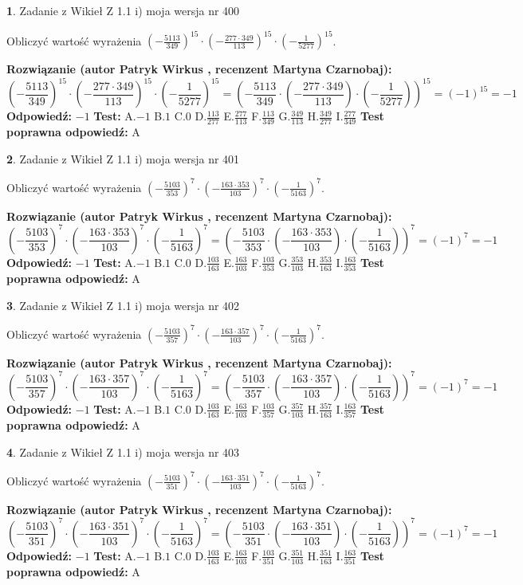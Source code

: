 \documentclass[12pt, a4paper]{article}
\theoremstyle{definition} %
\newtheorem{zad}{}
\newcommand{\zadStart}[1]{\begin{zad}#1\newline}
\newcommand{\zadStop}{\end{zad}}
\newcommand{\rozwStart}[2]{\noindent \textbf{Rozwiązanie (autor #1 , recenzent #2): }\newline}
\newcommand{\rozwStop}{\newline}
\newcommand{\odpStart}{\noindent \textbf{Odpowiedź:}\newline}
\newcommand{\odpStop}{\newline}
\newcommand{\testStart}{\noindent \textbf{Test:}\newline}
\newcommand{\testStop}{\newline}
\newcommand{\kluczStart}{\noindent \textbf{Test poprawna odpowiedź:}\newline}
\newcommand{\kluczStop}{\newline}
\begin{document}
\zadStart{Zadanie z Wikieł Z 1.1 i) moja wersja nr 400}

Obliczyć wartość wyrażenia $(-\frac{5113}{349})^{15} \cdot (-\frac{277 \cdot 349}{113})^{15} \cdot (-\frac{1}{5277})^{15}$.
\zadStop
\rozwStart{Patryk Wirkus}{Martyna Czarnobaj}
$$(-\frac{5113}{349})^{15} \cdot (-\frac{277 \cdot 349}{113})^{15} \cdot (-\frac{1}{5277})^{15} = (-\frac{5113}{349} \cdot (-\frac{277 \cdot 349}{113}) \cdot (-\frac{1}{5277}))^{15} = (-1)^{15} = -1$$
\rozwStop
\odpStart
$-1$
\odpStop
\testStart
A.$-1$ B.$1$ C.$0$ D.$\frac{113}{277}$ E.$\frac{277}{113}$
F.$\frac{113}{349}$ G.$\frac{349}{113}$
H.$\frac{349}{277}$
I.$\frac{277}{349}$
\testStop
\kluczStart
A
\kluczStop



\zadStart{Zadanie z Wikieł Z 1.1 i) moja wersja nr 401}

Obliczyć wartość wyrażenia $(-\frac{5103}{353})^{7} \cdot (-\frac{163 \cdot 353}{103})^{7} \cdot (-\frac{1}{5163})^{7}$.
\zadStop
\rozwStart{Patryk Wirkus}{Martyna Czarnobaj}
$$(-\frac{5103}{353})^{7} \cdot (-\frac{163 \cdot 353}{103})^{7} \cdot (-\frac{1}{5163})^{7} = (-\frac{5103}{353} \cdot (-\frac{163 \cdot 353}{103}) \cdot (-\frac{1}{5163}))^{7} = (-1)^{7} = -1$$
\rozwStop
\odpStart
$-1$
\odpStop
\testStart
A.$-1$ B.$1$ C.$0$ D.$\frac{103}{163}$ E.$\frac{163}{103}$
F.$\frac{103}{353}$ G.$\frac{353}{103}$
H.$\frac{353}{163}$
I.$\frac{163}{353}$
\testStop
\kluczStart
A
\kluczStop



\zadStart{Zadanie z Wikieł Z 1.1 i) moja wersja nr 402}

Obliczyć wartość wyrażenia $(-\frac{5103}{357})^{7} \cdot (-\frac{163 \cdot 357}{103})^{7} \cdot (-\frac{1}{5163})^{7}$.
\zadStop
\rozwStart{Patryk Wirkus}{Martyna Czarnobaj}
$$(-\frac{5103}{357})^{7} \cdot (-\frac{163 \cdot 357}{103})^{7} \cdot (-\frac{1}{5163})^{7} = (-\frac{5103}{357} \cdot (-\frac{163 \cdot 357}{103}) \cdot (-\frac{1}{5163}))^{7} = (-1)^{7} = -1$$
\rozwStop
\odpStart
$-1$
\odpStop
\testStart
A.$-1$ B.$1$ C.$0$ D.$\frac{103}{163}$ E.$\frac{163}{103}$
F.$\frac{103}{357}$ G.$\frac{357}{103}$
H.$\frac{357}{163}$
I.$\frac{163}{357}$
\testStop
\kluczStart
A
\kluczStop



\zadStart{Zadanie z Wikieł Z 1.1 i) moja wersja nr 403}

Obliczyć wartość wyrażenia $(-\frac{5103}{351})^{7} \cdot (-\frac{163 \cdot 351}{103})^{7} \cdot (-\frac{1}{5163})^{7}$.
\zadStop
\rozwStart{Patryk Wirkus}{Martyna Czarnobaj}
$$(-\frac{5103}{351})^{7} \cdot (-\frac{163 \cdot 351}{103})^{7} \cdot (-\frac{1}{5163})^{7} = (-\frac{5103}{351} \cdot (-\frac{163 \cdot 351}{103}) \cdot (-\frac{1}{5163}))^{7} = (-1)^{7} = -1$$
\rozwStop
\odpStart
$-1$
\odpStop
\testStart
A.$-1$ B.$1$ C.$0$ D.$\frac{103}{163}$ E.$\frac{163}{103}$
F.$\frac{103}{351}$ G.$\frac{351}{103}$
H.$\frac{351}{163}$
I.$\frac{163}{351}$
\testStop
\kluczStart
A
\kluczStop
\end{document}
